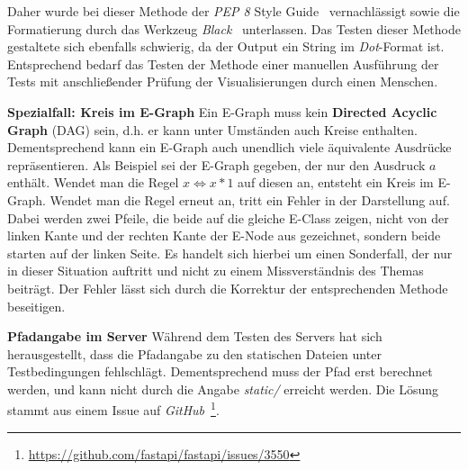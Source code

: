 Daher wurde bei dieser Methode der \textit{PEP 8} Style Guide~\cite{pep} vernachlässigt sowie die Formatierung durch das Werkzeug \textit{Black}~\cite{black} unterlassen.
Das Testen dieser Methode gestaltete sich ebenfalls schwierig, da der Output ein String im \textit{Dot}-Format ist. Entsprechend bedarf das Testen der Methode
einer manuellen Ausführung der Tests mit anschließender Prüfung der Visualisierungen durch einen Menschen.

\noindent\textbf{Spezialfall: Kreis im E-Graph} Ein E-Graph muss kein \textbf{Directed Acyclic Graph} (DAG) sein, d.h. er kann unter Umständen auch Kreise enthalten. 
Dementsprechend kann ein E-Graph auch unendlich viele äquivalente Ausdrücke repräsentieren.
Als Beispiel sei der E-Graph gegeben, der nur den Ausdruck $a$ enthält. Wendet man die Regel $x \Leftrightarrow x * 1$ auf diesen an, entsteht ein Kreis im E-Graph.
Wendet man die Regel erneut an, tritt ein Fehler in der Darstellung auf. Dabei werden zwei Pfeile, die beide auf die gleiche E-Class zeigen, nicht von der linken Kante und der rechten
Kante der E-Node aus gezeichnet, sondern beide starten auf der linken Seite. Es handelt sich hierbei um einen Sonderfall, der nur in dieser Situation auftritt und nicht zu einem 
Missverständnis des Themas beiträgt. Der Fehler lässt sich durch die Korrektur der entsprechenden Methode beseitigen.

\noindent\textbf{Pfadangabe im Server} Während dem Testen des Servers hat sich herausgestellt, dass die Pfadangabe zu den statischen Dateien unter Testbedingungen fehlschlägt.
Dementsprechend muss der Pfad erst berechnet werden, und kann nicht durch die Angabe \textit{static/} erreicht werden. Die Lösung stammt aus einem Issue auf 
\textit{GitHub}~\footnote{\hspace{1.5mm}\url{https://github.com/fastapi/fastapi/issues/3550}}.
